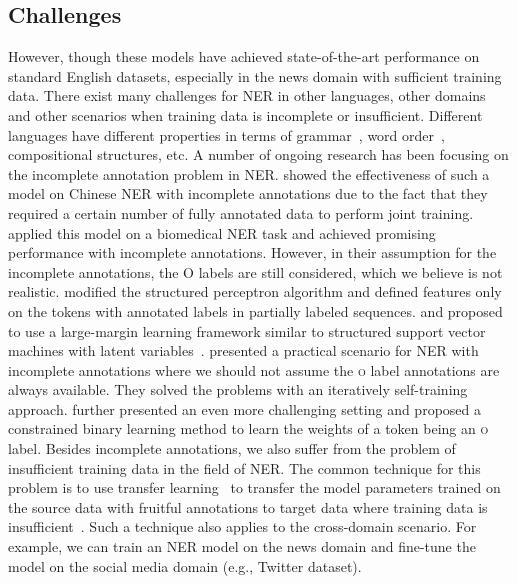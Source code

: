 \subsection{Challenges}
However, though these models have achieved state-of-the-art performance on standard English datasets, especially in the news domain with sufficient training data. 
There exist many challenges for NER in other languages, other domains and other scenarios when training data is incomplete or insufficient. 
Different languages have different properties in terms of grammar~\cite{chomsky1956three}, word order~\cite{greenberg1963some}, compositional structures, etc. 
A number of ongoing research has been focusing on the incomplete annotation problem in NER. 
\citet{yang2018distantly} showed the effectiveness of such a model on Chinese NER with incomplete annotations due to the fact that they required a certain number of fully annotated data to perform joint training. 
\citet{greenberg2018marginal} applied this model on a biomedical NER task and achieved promising performance with incomplete annotations. 
However, in their assumption for the incomplete annotations, the \textsc{O} labels are still considered, which we believe is not realistic. 
\citet{carlson2009learning} modified the structured perceptron algorithm and defined features only on the tokens with annotated labels in partially labeled sequences. 
\citet{fernandes2011learning} and \citet{lou2012structured} proposed to use a large-margin learning framework similar to structured support vector machines with latent variables~\cite{yu2009learning}. 
\citet{jie2019better} presented a practical scenario for NER with incomplete annotations where we should not assume the \textsc{o} label annotations are always available. 
They solved the problems with an iteratively self-training approach.
\citet{mayhew2019named} further presented an even more challenging setting and proposed a constrained binary learning method to learn the weights of a token being an \textsc{o} label. 
Besides incomplete annotations, we also suffer from the problem of insufficient training data in the field of NER. 
The common technique for this problem is to use transfer learning~\cite{pan2009survey,weiss2016survey} to transfer the model parameters trained on the source data with fruitful annotations to target data where training data is insufficient~\cite{yang2017transfer,lin2018neural}. 
Such a technique also applies to the cross-domain scenario. For example, we can train an NER model on the news domain and fine-tune the model on the social media domain (e.g., Twitter dataset).


